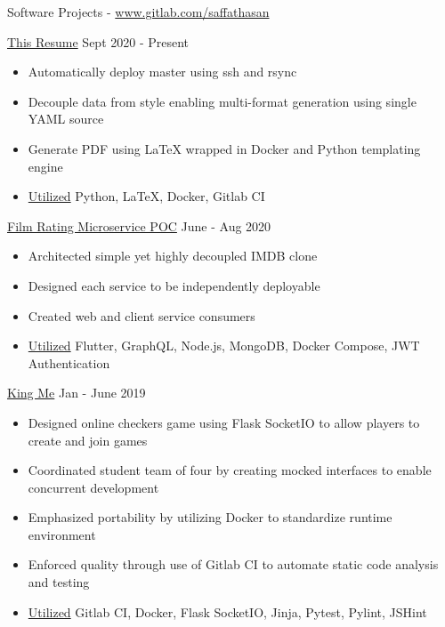 \documentclass[]{mcdowellcv}
\begin{document}
	\begin{cvsection}{Software Projects - \url{www.gitlab.com/saffathasan}}
		\begin{cvsubsection}
			{\href{https://gitlab.com/saffathasan/resume}{This Resume}}
			{}
			{Sept 2020 - Present}
			\begin{itemize}
				\item Automatically deploy master using ssh and rsync
				\item Decouple data from style enabling multi-format generation using single YAML source
				\item Generate PDF using LaTeX wrapped in Docker and Python templating engine
				\item \ul{Utilized} Python, LaTeX, Docker, Gitlab CI
			\end{itemize}
	    \end{cvsubsection}
		\begin{cvsubsection}
			{\href{https://gitlab.com/saffathasan/se572}{Film Rating Microservice POC}}
			{}
			{June - Aug 2020}
			\begin{itemize}
				\item Architected simple yet highly decoupled IMDB clone
				\item Designed each service to be independently deployable
				\item Created web and client service consumers
				\item \ul{Utilized} Flutter, GraphQL, Node.js, MongoDB, Docker Compose, JWT Authentication
			\end{itemize}
	    \end{cvsubsection}
		\begin{cvsubsection}
			{\href{https://gitlab.com/saffathasan/king-me}{King Me}}
			{}
			{Jan - June 2019}
			\begin{itemize}
				\item Designed online checkers game using Flask SocketIO to allow players to create and join games
				\item Coordinated student team of four by creating mocked interfaces to enable concurrent development
				\item Emphasized portability by utilizing Docker to standardize runtime environment
				\item Enforced quality through use of Gitlab CI to automate static code analysis and testing
				\item \ul{Utilized} Gitlab CI, Docker, Flask SocketIO, Jinja, Pytest, Pylint, JSHint
			\end{itemize}
	    \end{cvsubsection}
	\end{cvsection}
\end{document}
